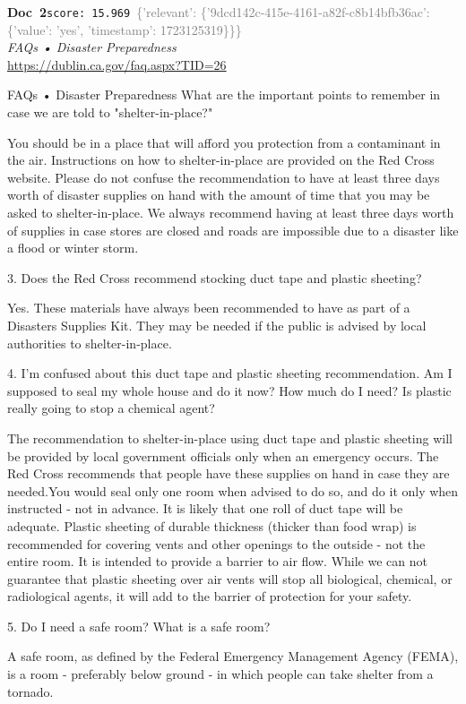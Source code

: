 \documentclass[a4paper,11pt]{article}
\begin{document}
\begin{docenv}
{\footnotesize\textcolor{doccolor}{\textbf{Doc~2}}}\hfill{\tiny\texttt{score:~15.969}}\ {\tiny\textcolor{gray}{\{'relevant': \{'9dcd142c-415e-4161-a82f-c8b14bfb36ac': \{'value': 'yes', 'timestamp': 1723125319\}\}\}}}\\[3pt]
{\small\textit{FAQs • Disaster Preparedness}}\\[2pt]
{\tiny\url{https://dublin.ca.gov/faq.aspx?TID=26}}\\[4pt]
{\footnotesize FAQs • Disaster Preparedness
What are the important points to remember in case we are told to "shelter-in-place?"

You should be in a place that will afford you protection from a contaminant in the air. Instructions on how to shelter-in-place are provided on the Red Cross website. Please do not confuse the recommendation to have at least three days worth of disaster supplies on hand with the amount of time that you may be asked to shelter-in-place. We always recommend having at least three days worth of supplies in case stores are closed and roads are impossible due to a disaster like a flood or winter storm. 	

3.
Does the Red Cross recommend stocking duct tape and plastic sheeting?

Yes. These materials have always been recommended to have as part of a Disasters Supplies Kit. They may be needed if the public is advised by local authorities to shelter-in-place.	

4.
I'm confused about this duct tape and plastic sheeting recommendation. Am I supposed to seal my whole house and do it now? How much do I need? Is plastic really going to stop a chemical agent?

The recommendation to shelter-in-place using duct tape and plastic sheeting will be provided by local government officials only when an emergency occurs. The Red Cross recommends that people have these supplies on hand in case they are needed.You would seal only one room when advised to do so, and do it only when instructed - not in advance. It is likely that one roll of duct tape will be adequate. Plastic sheeting of durable thickness (thicker than food wrap) is recommended for covering vents and other openings to the outside - not the entire room. It is intended to provide a barrier to air flow. While we can not guarantee that plastic sheeting over air vents will stop all biological, chemical, or radiological agents, it will add to the barrier of protection for your safety.	

5.
Do I need a safe room? What is a safe room?

A safe room, as defined by the Federal Emergency Management Agency (FEMA), is a room - preferably below ground - in which people can take shelter from a tornado.}
\end{docenv}
\end{document}
